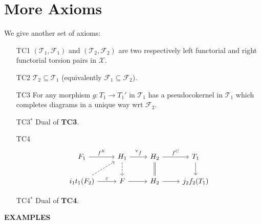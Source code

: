 \clearpage

\section{More Axioms}

We give another set of axioms:

\begin{enumerate}
  \item[TC1] $(\mathcal{T}_1, \mathcal{F}_1)$ and $(\mathcal{T}_2,\mathcal{F}_2)$ are two respectively
  left functorial and right functorial torsion pairs in $\mathcal{X}$.
  \item[TC2] $\mathcal{T}_2\subseteq\mathcal{T}_1$ (equivalently $\mathcal{F}_1\subseteq\mathcal{F}_2$).
  \item[TC3] For any morphism $g:T_1 \to T_1'$ in $\mathcal{T}_1$ has a pseudocokernel in $\mathcal{T}_1$ which
  completes diagrams in a unique way wrt $\mathcal{F}_2$.
  \item[TC3$^*$] Dual of \textbf{TC3}.
  \item[TC4]
  \begin{equation*}
    \begin{tikzcd}
      F_1\arrow{r}{f^K}
        & H_1\arrow{r}{^\forall f}\arrow[dashed]{d}
          & H_2 \arrow{r}{f^C}\arrow[equal]{d}
            & T_1 \arrow{d}\\
      i_1t_1(F_2)\arrow[dashed]{ur}\arrow{r}{\varepsilon}
        & F\arrow{r}
          & H_2\arrow{r}
            & j_2f_2(T_1)
    \end{tikzcd}
  \end{equation*}
  \item[TC4$^*$] Dual of \textbf{TC4}.
\end{enumerate}

\textbf{EXAMPLES}

